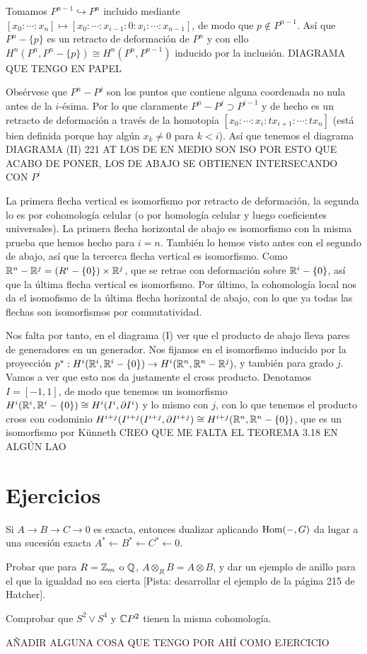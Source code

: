\documentclass[TA.tex]{subfiles}
\begin{document}
\begin{dem}
Tomamos $P^{n-1}\hookrightarrow P^n$ incluido mediante $[x_0:\cdots:x_n]\mapsto[x_0:\cdots:x_{i-1}:0:x_i:\cdots:x_{n-1}]$, de modo que $p\notin P^{n-1}$. Así que $P^n-\{p\}$ es un retracto de deformación de $P^n$ y con ello $H^n(P^n,P^n-\{p\})\cong H^n(P^n, P^{n-1})$ inducido por la inclusión. DIAGRAMA QUE TENGO EN PAPEL


Obsérvese que $P^n-P^j$ son los puntos que contiene alguna coordenada no nula antes de la $i$-ésima. Por lo que claramente $P^n-P^j\supset P^{i-1}$ y de hecho es un retracto de deformación a través de la homotopía $[x_0:\cdots: x_i: tx_{i+1}:\cdots: tx_n]$ (está bien definida porque hay algún $x_k\neq 0$ para $k<i$). Así que tenemos el diagrama DIAGRAMA (II) 221 AT LOS DE EN MEDIO SON ISO POR ESTO QUE ACABO DE PONER, LOS DE ABAJO SE OBTIENEN INTERSECANDO CON $P^i$

La primera flecha vertical es isomorfismo por retracto de deformación, la segunda lo es por cohomología celular (o por homología celular y luego coeficientes universales). La primera flecha horizontal de abajo es isomorfismo con la misma prueba que hemos hecho para $i=n$. También lo hemos visto antes con el segundo de abajo, así que la tercerca flecha vertical es isomorfismo. Como $\mathbb{R}^n-\mathbb{R}^j=(R^i-\{0\})\times\mathbb{R}^j$, que se retrae con deformación sobre $\mathbb{R}^i-\{0\}$, así que la última flecha vertical es isomorfismo. Por último, la cohomología local nos da el isomofismo de la última flecha horizontal de abajo, con lo que ya todas las flechas son isomorfismos por conmutatividad. 

Nos falta por tanto, en el diagrama (I) ver que el producto de abajo lleva pares de generadores en un generador. Nos fijamos en el isomorfismo inducido por la proyección $p^*:H^i(\mathbb{R}^i,\mathbb{R}^i-\{0\})\to H^i(\mathbb{R}^n,\mathbb{R}^n-\mathbb{R}^j)$, y también para grado $j$. Vamos a ver que esto nos da justamente el cross producto. Denotamos $I=[-1,1]$, de modo que tenemos un isomorfismo $H^i(\mathbb{R}^i,\mathbb{R}^i-\{0\})\cong H^i(I^i,\partial I^i)$ y lo mismo con $j$, con lo que tenemos el producto cross con codominio $H^{i+j}(I^{i+j}(I^{i+j},\partial I^{i+j})\cong H^{i+j}(\mathbb{R}^n,\mathbb{R}^n-\{0\})$, que es un isomorfismo por Künneth CREO QUE ME FALTA EL TEOREMA 3.18 EN ALGÚN LAO
\end{dem}

\section{Ejercicios}
\begin{ejer}
Si $A\to B\to C\to 0$ es exacta, entonces dualizar aplicando $\operatorname{Hom}(-,G)$ da lugar a una sucesión exacta $A^*\leftarrow B^*\leftarrow C^*\leftarrow 0$.
\end{ejer}

\begin{ejer}
Probar que para $R=\mathbb{Z}_m$ o $\mathbb{Q}$, $A\otimes_R B=A\otimes B$, y dar un ejemplo de anillo para el que la igualdad no sea cierta [Pista: desarrollar el ejemplo de la página 215 de Hatcher].
\end{ejer}

\begin{ejer}
Comprobar que $S^2\vee S^4$ y $\mathbb{C} P^2$ tienen la misma cohomología. 
\end{ejer}
AÑADIR ALGUNA COSA QUE TENGO POR AHÍ COMO EJERCICIO
\end{document}
